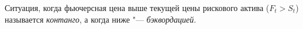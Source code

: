 \begin{remark}
Ситуация, когда фьючерсная цена выше текущей цены рискового актива ($F_t> S_t$) называется \emph{контанго}, а когда ниже "--- \emph{бэквордацией}.
\end{remark}





